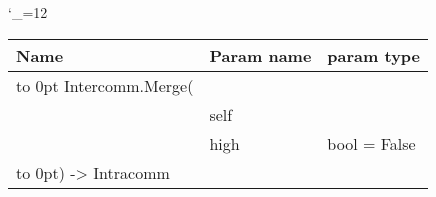 \begingroup \catcode`\_=12 \tt
\begin{tabular}{lll}
\toprule
\textrm{Name}&\textrm{Param name}&\textrm{param type}\\
\midrule
\hbox to 0pt {Intercomm.Merge(\hss}\\
& self\\
& high & bool = False\\
\hbox to 0pt{) -> Intracomm\hss}\\
\bottomrule
\end{tabular}
\endgroup
